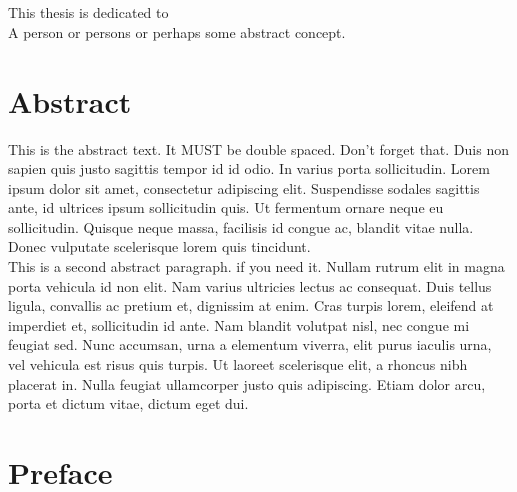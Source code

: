   
   \newpage 
  \chapter*{}
  \thispagestyle{empty}
  This thesis is dedicated to\\
  A person or persons or perhaps some abstract concept.

  \newpage 
  \chapter*{Abstract}
  \thispagestyle{empty}
  \vspace*{-0.7in}
  \renewcommand{\baselinestretch}{1.8}
  \normalsize{
  This is the abstract text. It MUST be double spaced. Don't forget that. Duis non sapien quis justo sagittis tempor id id odio. In varius porta sollicitudin. Lorem ipsum dolor sit amet, consectetur adipiscing elit. Suspendisse sodales sagittis ante, id ultrices ipsum sollicitudin quis. Ut fermentum ornare neque eu sollicitudin. Quisque neque massa, facilisis id congue ac, blandit vitae nulla. Donec vulputate scelerisque lorem quis tincidunt.
  } \vspace*{-0.2in} \\
  
  \normalsize{
  This is a second abstract paragraph. if you need it. Nullam rutrum elit in magna porta vehicula id non elit. Nam varius ultricies lectus ac consequat. Duis tellus ligula, convallis ac pretium et, dignissim at enim. Cras turpis lorem, eleifend at imperdiet et, sollicitudin id ante. Nam blandit volutpat nisl, nec congue mi feugiat sed. Nunc accumsan, urna a elementum viverra, elit purus iaculis urna, vel vehicula est risus quis turpis. Ut laoreet scelerisque elit, a rhoncus nibh placerat in. Nulla feugiat ullamcorper justo quis adipiscing. Etiam dolor arcu, porta et dictum vitae, dictum eget dui.
  }
  \renewcommand{\baselinestretch}{1.33}
  
  \newpage 
  \chapter*{Preface}
  \thispagestyle{empty}
  \vspace*{-0.7in}


